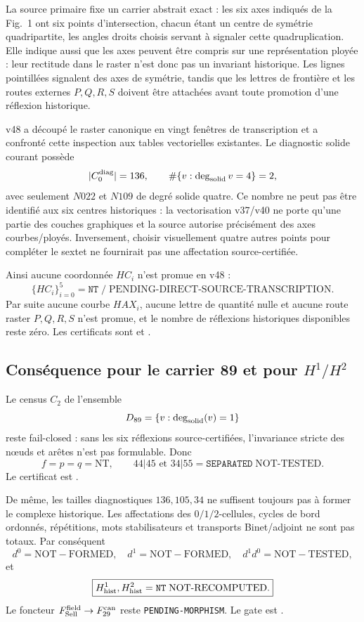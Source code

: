 \documentclass[11pt,a4paper]{article}
\newcommand{\certSeparated}{\texttt{SEPARATED}}
\newcommand{\certPending}{\texttt{PENDING-MORPHISM}}
\newcommand{\certNT}{\texttt{NT}}
\begin{document}
La source primaire fixe un carrier abstrait exact : les six axes indiqués de la Fig.~1 ont six points d'intersection, chacun étant un centre de symétrie quadripartite, les angles droits choisis servant à signaler cette quadruplication. Elle indique aussi que les axes peuvent être compris sur une représentation ployée : leur rectitude dans le raster n'est donc pas un invariant historique. Les lignes pointillées signalent des axes de symétrie, tandis que les lettres de frontière et les routes externes $P,Q,R,S$ doivent être attachées avant toute promotion d'une réflexion historique.

v48 a découpé le raster canonique en vingt fenêtres de transcription et a confronté cette inspection aux tables vectorielles existantes. Le diagnostic solide courant possède
\[
 |C_0^{\rm diag}|=136,
 \qquad
 \#\{v:\deg_{\rm solid}v=4\}=2,
\]
avec seulement $N022$ et $N109$ de degré solide quatre. Ce nombre ne peut pas être identifié aux six centres historiques : la vectorisation v37/v40 ne porte qu'une partie des couches graphiques et la source autorise précisément des axes courbes/ployés. Inversement, choisir visuellement quatre autres points pour compléter le sextet ne fournirait pas une affectation source-certifiée.

Ainsi aucune coordonnée $HC_i$ n'est promue en v48 :
\[
 \boxed{
 \{HC_i\}_{i=0}^{5}
 =\certNT\;/\;\text{PENDING-DIRECT-SOURCE-TRANSCRIPTION}.}
\]
Par suite aucune courbe $HAX_i$, aucune lettre de quantité nulle et aucune route raster $P,Q,R,S$ n'est promue, et le nombre de réflexions historiques disponibles reste zéro. Les certificats sont  et .

\subsection{Conséquence pour le carrier 89 et pour $H^1/H^2$}

Le census $C_2$ de l'ensemble
\[
 D_{89}=\{v:\deg_{\rm solid}(v)=1\}
\]
reste fail-closed : sans les six réflexions source-certifiées, l'invariance stricte des nœuds et arêtes n'est pas formulable. Donc
\[
 \boxed{
 f=p=q=\mathrm{NT},\qquad
 44|45\text{ et }34|55=\certSeparated\;\text{NOT-TESTED}.}
\]
Le certificat est .

De même, les tailles diagnostiques $136,105,34$ ne suffisent toujours pas à former le complexe historique. Les affectations des $0/1/2$-cellules, cycles de bord ordonnés, répétitions, mots stabilisateurs et transports Binet/adjoint ne sont pas totaux. Par conséquent
\[
 \boxed{d^0=\mathrm{NOT\!\! -FORMED},\quad d^1=\mathrm{NOT\!\! -FORMED},\quad d^1d^0=\mathrm{NOT\!\! -TESTED},}
\]
et
\[
 \boxed{H^1_{\rm hist},H^2_{\rm hist}=\certNT\;\text{NOT-RECOMPUTED}.}
\]
Le foncteur $F_{\rm Sell}^{\rm field}\to F_{29}^{\rm can}$ reste \certPending. Le gate est .
\end{document}
